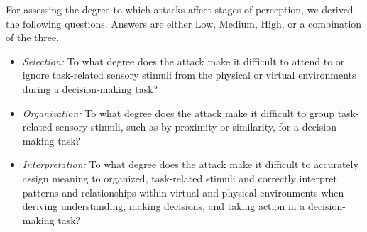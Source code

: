 

For assessing the degree to which attacks affect stages of perception, we derived the following questions. Answers are either Low, Medium, High, or a combination of the three.  %

\begin{itemize}
\itemsep0em
    \item \emph{Selection:} To what degree does the attack make it difficult to attend to or ignore task-related sensory stimuli from the physical or virtual environments during a decision-making task? 
    \item \emph{Organization:} To what degree does the attack make it difficult to group task-related sensory stimuli, such as by proximity or similarity, for a decision-making task?
    \item \emph{Interpretation:} To what degree does the attack make it difficult to accurately assign meaning to organized, task-related stimuli and correctly interpret patterns and relationships within virtual and physical environments when deriving understanding, making decisions, and taking action in a decision-making task?
\end{itemize}    

